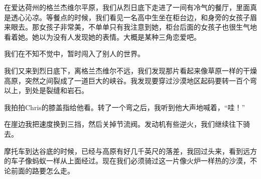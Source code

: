 \documentclass[UTF8]{article}
\begin{document}
\par 在爱达荷州的格兰杰维尔平原，我们从烈日底下走进了一间有冷气的餐厅，里面真是透心沁凉。等餐点的时候，我们看见一名高中生坐在柜台边，和身旁的女孩子眉来眼去。那女孩子非常美，不单单只有我注意到她，柜台后面的女孩子也很生气地看着她。她以为没有人发现她的表情。大概是某种三角恋爱吧。
\par 我们在不知不觉中，暂时闯入了别人的世界。
\par 我们又来到烈日底下，离格兰杰维尔不远，我们发现那片看起来像草原一样的干燥高原，突然之间裂成了一道巨大的峡谷。我发现要穿过沙漠地区起码要转一百个弯以上，到处是裂缝和岩石。
\par 我拍拍Chris的膝盖指给他看。转了一个弯之后，我听到他大声地喊着，“哇！”
\par 在崖边我把速度换到三挡，然后关掉节流阀。发动机有些逆火，我们继续往下骑去。
\par 摩托车到达谷底的时候，已经与高原有好几千英尺的落差，我回过头来，看到远方的车子像蚂蚁一样从上面经过。现在我们必须骑过这一片像火炉一样热的沙漠，不论前面的路要怎么走。
\end{document}
